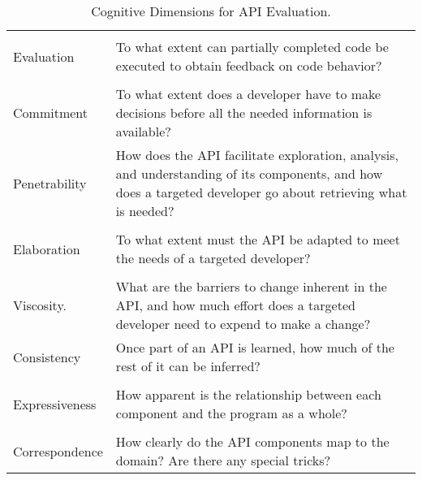 \begin{table}[]
\begin{tabularx}{\textwidth}{|l|X|}
\begin{tabular}[c]{@{}l@{}}Progressive\\ Evaluation\end{tabular} & To what extent can partially completed code be executed to obtain feedback on code behavior?                                                                  \\ \hline
\begin{tabular}[c]{@{}l@{}}Premature\\ Commitment\end{tabular}   & To what extent does a developer have to make decisions before all the needed information is available?                                                        \\ \hline
Penetrability                                                    & How does the API facilitate exploration, analysis, and understanding of its components, and how does a targeted developer go about retrieving what is needed? \\ \hline
\begin{tabular}[c]{@{}l@{}}API\\ Elaboration\end{tabular}        & To what extent must the API be adapted to meet the needs of a targeted developer?                                                                             \\ \hline
\begin{tabular}[c]{@{}l@{}}API\\ Viscosity.\end{tabular}         & What are the barriers to change inherent in the API, and how much effort does a targeted developer need to expend to make a change?                           \\ \hline
Consistency                                                      & Once part of an API is learned, how much of the rest of it can be inferred?                                                                                   \\ \hline
\begin{tabular}[c]{@{}l@{}}Role\\ Expressiveness\end{tabular}    & How apparent is the relationship between each component and the program as a whole?                                                                           \\ \hline
\begin{tabular}[c]{@{}l@{}}Domain\\ Correspondence\end{tabular}  & How clearly do the API components map to the domain? Are there any special tricks?                                                                            \\ \hline
\end{tabularx}
\caption{Cognitive Dimensions for \gls{API} Evaluation.}
\label{tab:cogdims}
\end{table}

